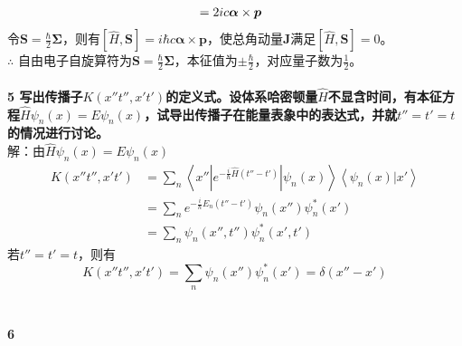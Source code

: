\documentclass[12pt]{article}
\numberwithin{equation}{section}	 %
\begin{document}
\begin{spacing}{1.5}
\begin{align}
&= 2ic\bm{\alpha} \times \bm{p} \notag 
\end{align}
令$\displaystyle \bm{S} = \frac{\hbar}{2}\bm\Sigma$，则有$\displaystyle \left[ \hat{H} , \bm{S} \right] = i\hbar c\bm{\alpha} \times \bm{p}$，使总角动量$\bm{J}$满足$\displaystyle \left[ \hat{H} , \bm{S} \right] = 0$。\\
$\therefore$ 自由电子自旋算符为$\displaystyle \bm{S} = \frac{\hbar}{2}\bm\Sigma$，本征值为$\displaystyle \pm\frac{\hbar}{2}$，对应量子数为$\displaystyle \frac{1}{2}$。
~\\
~\\
\textbf{5 \quad 写出传播子$K(x''t'',x't')$的定义式。设体系哈密顿量$\hat{H}$不显含时间，有本征方程$\hat{H}\psi_{n}(x)=E\psi_{n}(x)$，试导出传播子在能量表象中的表达式，并就$t''=t'=t$的情况进行讨论。}\\
解：由$\hat{H}\psi_{n}(x)=E\psi_{n}(x)$
\begin{equation}
\begin{aligned}
K(x''t'',x't') &= \sum_{n}\left<x''\left|e^{-\frac{i}{\hbar}\hat{H}(t''-t')}\right|\psi_{n}(x)\right> \left<\psi_{n}(x)\Big|x'\right> \\
&= \sum_{n}e^{-\frac{i}{\hbar}E_{n}(t''-t')}\psi_{n}(x'')\psi^{*}_{n}(x') \\
&= \sum_{n}\psi_{n}(x'',t'')\psi^{*}_{n}(x',t')
\end{aligned}
\end{equation}
若$t''=t'=t$，则有
\begin{equation}
K(x''t'',x't') = \sum_{n}\psi_{n}(x'')\psi^{*}_{n}(x') = \delta(x''-x')
\end{equation}
~\\
~\\
\textbf{6 \quad }\\



\end{spacing} 		%
\end{document}
